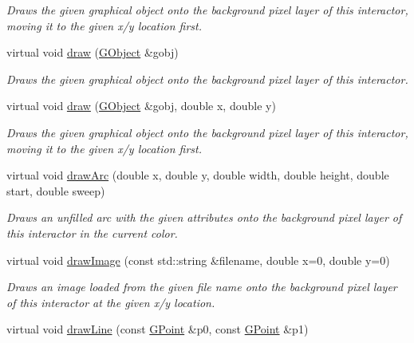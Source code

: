 \begin{DoxyCompactItemize}
\begin{DoxyCompactList}\small\item\em Draws the given graphical object onto the background pixel layer of this interactor, moving it to the given x/y location first. \end{DoxyCompactList}\item 
virtual void \mbox{\hyperlink{classsgl_1_1GDrawingSurface_a022a8d51c7fabcd79a0c809233e93453}{draw}} (\mbox{\hyperlink{classsgl_1_1GObject}{G\+Object}} \&gobj)
\begin{DoxyCompactList}\small\item\em Draws the given graphical object onto the background pixel layer of this interactor. \end{DoxyCompactList}\item 
virtual void \mbox{\hyperlink{classsgl_1_1GDrawingSurface_a8af8762bd6720e0a1d2a84b190e3dc96}{draw}} (\mbox{\hyperlink{classsgl_1_1GObject}{G\+Object}} \&gobj, double x, double y)
\begin{DoxyCompactList}\small\item\em Draws the given graphical object onto the background pixel layer of this interactor, moving it to the given x/y location first. \end{DoxyCompactList}\item 
virtual void \mbox{\hyperlink{classsgl_1_1GDrawingSurface_a38b6fae1045191c57092b49905068144}{draw\+Arc}} (double x, double y, double width, double height, double start, double sweep)
\begin{DoxyCompactList}\small\item\em Draws an unfilled arc with the given attributes onto the background pixel layer of this interactor in the current color. \end{DoxyCompactList}\item 
virtual void \mbox{\hyperlink{classsgl_1_1GDrawingSurface_abdd4cb1f2c64adc5d03522a1ee30febf}{draw\+Image}} (const std\+::string \&filename, double x=0, double y=0)
\begin{DoxyCompactList}\small\item\em Draws an image loaded from the given file name onto the background pixel layer of this interactor at the given x/y location. \end{DoxyCompactList}\item 
virtual void \mbox{\hyperlink{classsgl_1_1GDrawingSurface_ae6a24b6b9a6e795d3165c1c750d5bdf1}{draw\+Line}} (const \mbox{\hyperlink{structsgl_1_1GPoint}{G\+Point}} \&p0, const \mbox{\hyperlink{structsgl_1_1GPoint}{G\+Point}} \&p1)

\end{DoxyCompactItemize}
